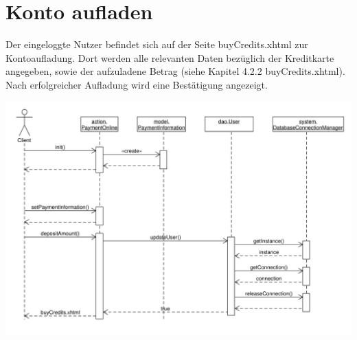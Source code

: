 \section{Konto aufladen}

Der eingeloggte Nutzer befindet sich auf der Seite buyCredits.xhtml zur Kontoaufladung. Dort werden alle relevanten Daten bezüglich der Kreditkarte angegeben, sowie der aufzuladene Betrag (siehe Kapitel 4.2.2 buyCredits.xhtml). Nach erfolgreicher Aufladung wird eine Bestätigung angezeigt.

\includegraphics[scale=0.45]{./Grafiken/Sequenzdiagramm-KontoAufladung.pdf}